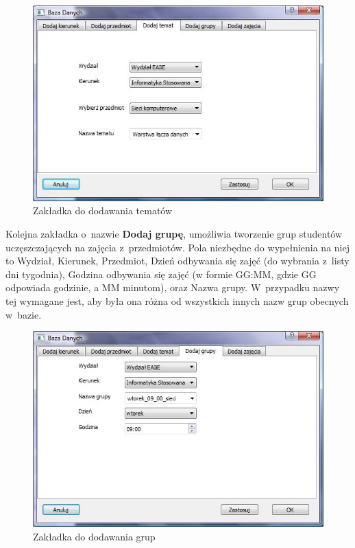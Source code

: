 \begin{figure}
\begin{center}
\includegraphics[scale=0.7]{dodaj_temat.jpg}
\caption{Zakładka do dodawania tematów}
\label{fig:dodajTemat}
\end{center}
\end{figure}

Kolejna zakładka o~nazwie \textbf{Dodaj grupę}, umożliwia tworzenie grup studentów uczęszczających na zajęcia z~przedmiotów. Pola niezbędne do wypełnienia na niej to Wydział, Kierunek, Przedmiot, Dzień odbywania się zajęć (do wybrania z~listy dni tygodnia), Godzina odbywania się zajęć (w formie GG:MM, gdzie GG odpowiada godzinie, a MM minutom), oraz Nazwa grupy. W~przypadku nazwy tej wymagane jest, aby była ona różna od wszystkich innych nazw grup obecnych w~bazie.

\begin{figure}
\begin{center}
\includegraphics[scale=0.7]{dodaj_grupe.jpg}
\caption{Zakładka do dodawania grup}
\label{fig:dodajGrupe}
\end{center}
\end{figure}

